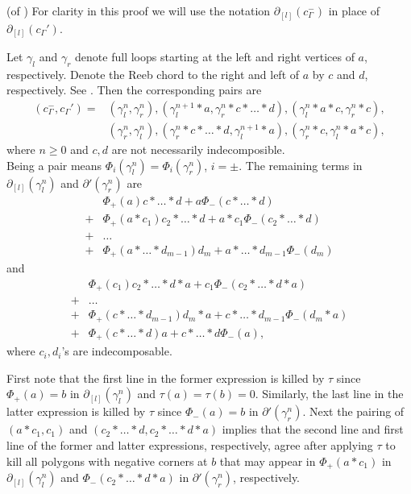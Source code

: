 \documentclass[11pt]{amsart}
\makeatletter
\renewenvironment{proof}[1][\proofname] {\par\pushQED{\qed}{\normalfont\bfseries\topsep6\p@\@plus6\p@\relax #1\@addpunct{.} }}{\popQED\endtrivlist\@endpefalse}
\theoremstyle{mystyle}
\newcommand{\<}{\langle}
\renewcommand{\>}{\rangle}
\makeatother
\begin{document}
\noindent \begin{proof}(of ) For clarity in this proof we will use the notation $\partial_{[l]}(c_\Gamma^-)$ in place of $\partial_{[l]}(c_\Gamma')$.

 Let $\gamma_l$ and $\gamma_r$ denote full loops starting at the left and right vertices of $a$, respectively. Denote the Reeb chord to the right and left of $a$ by $c$ and $d$, respectively. See . Then the corresponding pairs are \begin{align*}
        (c_\Gamma^-, c_\Gamma') = &(\gamma_l^n, \gamma_r^n), (\gamma_l^{n+1} * a, \gamma_r^n * c * \dots  * d), (\gamma_l^n * a * c, \gamma_r^n * c), \\
        &(\gamma_r^n, \gamma_l^n), (\gamma_r^n * c * \dots  * d, \gamma_l^{n+1} * a), (\gamma_r^n * c, \gamma_l^n * a * c),        
    \end{align*} where $n \geq 0$ and $c, d$ are not necessarily indecomposible. \\
     Being a pair means $\Phi_i(\gamma_l^n) = \Phi_i(\gamma_r^n)$, $i = \pm$. The remaining terms in $\partial_{[l]}(\gamma_l^n)$ and $\partial'(\gamma_r^n)$ are \begin{align*}
        &\Phi_+(a) c * \dots  * d + a\Phi_-(c * \dots  * d) \\
        +& \Phi_+(a * c_1) c_2 * \dots  * d + a*c_1 \Phi_-(c_2 * \dots  * d) \\
        +& \ldots \\
        +& \Phi_+(a * \dots  * d_{m-1}) d_m + a * \dots  * d_{m-1} \Phi_-(d_m)
    \end{align*} and \begin{align*}
        &\Phi_+(c_1) c_2 * \dots  * d * a + c_1\Phi_-(c_2 * \dots  * d * a) \\
        +& \ldots \\
        +& \Phi_+(c * \dots  * d_{m-1}) d_m * a + c * \dots  * d_{m-1} \Phi_-(d_m * a) \\
        +& \Phi_+(c * \dots  * d)a + c*\dots *d\Phi_-(a),
    \end{align*} where $c_i, d_i$'s are indecomposable. 
    
    First note that the first line in the former expression is killed by $\tau$ since $\Phi_+(a) = b$ in $\partial_{[l]}(\gamma^n_l)$ and $\tau(a) = \tau(b) = 0$. Similarly, the last line in the latter expression is killed by $\tau$ since $\Phi_-(a) = b$ in $\partial'(\gamma^n_r)$. Next the pairing of $(a * c_1, c_1)$ and $(c_2 * \dots  * d, c_2 * \dots  * d * a)$ implies that the second line and first line of the former and latter expressions, respectively, agree after applying $\tau$ to kill all polygons with negative corners at $b$ that may appear in $\Phi_+(a * c_1)$ in $\partial_{[l]}(\gamma_l^n)$ and $\Phi_-(c_2 * \dots  * d * a)$ in $\partial'(\gamma_r^n)$, respectively.
    

\end{proof}
\end{document}
